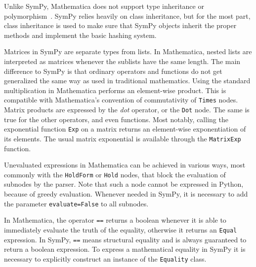 
Unlike SymPy, Mathematica does not support type inheritance or poly\-morph\-ism~\cite{Fateman1992}.
%
SymPy relies heavily on class inheritance, but for the most part,
class inheritance is used to make sure that SymPy objects inherit the proper
methods and implement the basic hashing system.


Matrices in SymPy are separate types from lists.
In Mathematica, nested lists are interpreted as matrices whenever the sublists
have the same length.
The main difference to SymPy is that ordinary operators and functions
do not get generalized the same way as used in traditional mathematics.
Using the standard multiplication in Mathematica performs an element-wise
product. This is compatible with Mathematica's convention of commutativity of
\texttt{Times} nodes.
Matrix products are expressed by the \textit{dot} operator,
or the \texttt{Dot} node.
The same is true for the other operators, and even functions.
Most notably, calling the exponential function \texttt{Exp} on a matrix
returns an element-wise exponentiation of its elements.
The usual matrix exponential is available through the \texttt{MatrixExp}
function.


Unevaluated expressions in Mathematica can be achieved in various ways,
most commonly with the \texttt{HoldForm} or \texttt{Hold} nodes,
that block the evaluation of subnodes by the parser.
Note that such a node cannot be expressed in Python, because of greedy evaluation.
Whenever needed in SymPy, it is necessary to add the parameter \texttt{evaluate=False}
to all subnodes.


In Mathematica, the operator \texttt{==} returns a boolean whenever it is able
to immediately evaluate the truth of the equality, otherwise it returns an
\texttt{Equal} expression.  In SymPy, \texttt{==} means structural equality and
is always guaranteed to return a boolean expression.  To express a mathematical equality in
SymPy it is necessary to explicitly construct an instance of the \texttt{Equality}
class.

